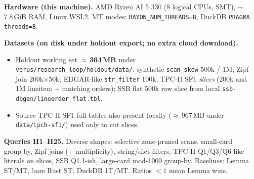 \documentclass[sigconf, nonacm]{acmart}
\begin{document}
\noindent\textbf{Hardware (this machine).}
AMD Ryzen AI 5 330 (8 logical CPUs, SMT), $\sim$7.8\,GiB RAM, Linux WSL2.
MT modes: \texttt{RAYON\_NUM\_THREADS=8}, DuckDB \texttt{PRAGMA threads=8}.

\noindent\textbf{Datasets (on disk under holdout export; no extra cloud download).}
\begin{itemize}
  \item Holdout working set $\approx$\,\textbf{364\,MB} under
        \texttt{verus/research\_loop/holdout/data/}:
        synthetic \texttt{scan\_skew} 500k / 1M; Zipf join 200k$\times$50k;
        EDGAR-like \texttt{str\_filter} 100k; TPC-H SF1 \emph{slices}
        (200k and 1M lineitem + matching orders); SSB flat 500k row slice
        from local \texttt{ssb-dbgen/lineorder\_flat.tbl}.
  \item Source TPC-H SF1 full tables also present locally ($\approx$\,967\,MB under
        \texttt{data/tpch-sf1/}) used only to cut slices.
\end{itemize}

\noindent\textbf{Queries H1--H25.} Diverse shapes: selective zone-pruned scans,
small-card group-by, Zipf joins (+ multiplicity), string/dict filters, TPC-H
Q1/Q3/Q6-like literals on slices, SSB Q1.1-ish, large-card mod-1000 group-by.
Baselines: Lemma ST/MT, bare Rust ST, DuckDB 1T/MT. Ratios $<1$ mean Lemma wins.
\end{document}
